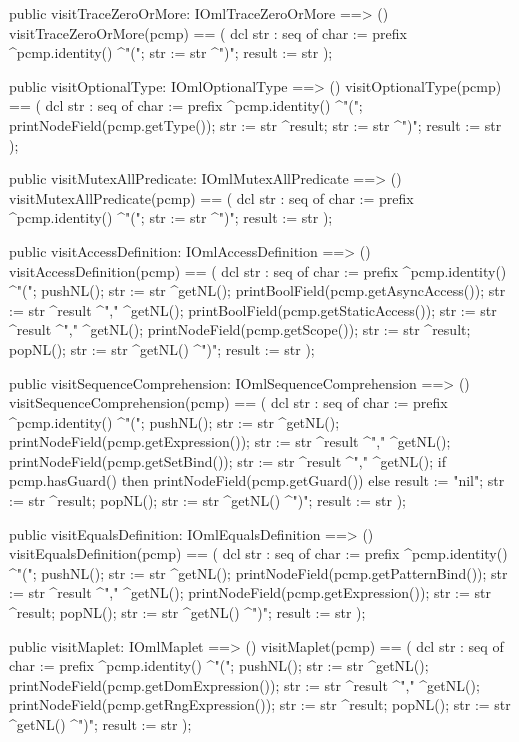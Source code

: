 \begin{vdm_al}
  public visitTraceZeroOrMore: IOmlTraceZeroOrMore ==> ()
  visitTraceZeroOrMore(pcmp) ==
    ( dcl str : seq of char := prefix ^pcmp.identity() ^"(";
      str := str ^")";
      result := str );

  public visitOptionalType: IOmlOptionalType ==> ()
  visitOptionalType(pcmp) ==
    ( dcl str : seq of char := prefix ^pcmp.identity() ^"(";
      printNodeField(pcmp.getType());
      str := str ^result;
      str := str ^")";
      result := str );

  public visitMutexAllPredicate: IOmlMutexAllPredicate ==> ()
  visitMutexAllPredicate(pcmp) ==
    ( dcl str : seq of char := prefix ^pcmp.identity() ^"(";
      str := str ^")";
      result := str );

  public visitAccessDefinition: IOmlAccessDefinition ==> ()
  visitAccessDefinition(pcmp) ==
    ( dcl str : seq of char := prefix ^pcmp.identity() ^"(";
      pushNL();
      str := str ^getNL();
      printBoolField(pcmp.getAsyncAccess());
      str := str ^result ^"," ^getNL();
      printBoolField(pcmp.getStaticAccess());
      str := str ^result ^"," ^getNL();
      printNodeField(pcmp.getScope());
      str := str ^result;
      popNL();
      str := str ^getNL() ^")";
      result := str );

  public visitSequenceComprehension: IOmlSequenceComprehension ==> ()
  visitSequenceComprehension(pcmp) ==
    ( dcl str : seq of char := prefix ^pcmp.identity() ^"(";
      pushNL();
      str := str ^getNL();
      printNodeField(pcmp.getExpression());
      str := str ^result ^"," ^getNL();
      printNodeField(pcmp.getSetBind());
      str := str ^result ^"," ^getNL();
      if pcmp.hasGuard()
      then printNodeField(pcmp.getGuard())
      else result := "nil";
      str := str ^result;
      popNL();
      str := str ^getNL() ^")";
      result := str );

  public visitEqualsDefinition: IOmlEqualsDefinition ==> ()
  visitEqualsDefinition(pcmp) ==
    ( dcl str : seq of char := prefix ^pcmp.identity() ^"(";
      pushNL();
      str := str ^getNL();
      printNodeField(pcmp.getPatternBind());
      str := str ^result ^"," ^getNL();
      printNodeField(pcmp.getExpression());
      str := str ^result;
      popNL();
      str := str ^getNL() ^")";
      result := str );

  public visitMaplet: IOmlMaplet ==> ()
  visitMaplet(pcmp) ==
    ( dcl str : seq of char := prefix ^pcmp.identity() ^"(";
      pushNL();
      str := str ^getNL();
      printNodeField(pcmp.getDomExpression());
      str := str ^result ^"," ^getNL();
      printNodeField(pcmp.getRngExpression());
      str := str ^result;
      popNL();
      str := str ^getNL() ^")";
      result := str );


\end{vdm_al}
